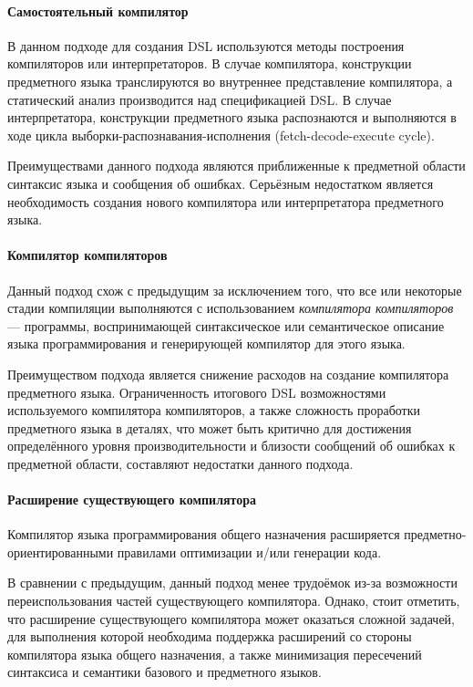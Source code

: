 \paragraph{Самостоятельный компилятор}
В данном подходе для создания DSL используются методы построения
компиляторов или интерпретаторов. В случае компилятора, конструкции
предметного языка транслируются во внутреннее представление компилятора, а
статический анализ производится над спецификацией DSL. В случае
интерпретатора, конструкции предметного языка распознаются и выполняются
в ходе цикла выборки-распознавания-исполнения (fetch-decode-execute cycle).

Преимуществами данного подхода являются приближенные к предметной
области синтаксис языка и сообщения об ошибках. Серьёзным недостатком
является необходимость создания нового компилятора или интерпретатора
предметного языка.

\paragraph{Компилятор компиляторов}
Данный подход схож с предыдущим за исключением того, что все или некоторые
стадии компиляции выполняются с использованием \textit{компилятора компиляторов} --- программы, воспринимающей синтаксическое или семантическое
описание языка программирования и генерирующей компилятор для этого языка.

Преимуществом подхода является снижение расходов на создание компилятора
предметного языка. Ограниченность итогового DSL возможностями используемого
компилятора компиляторов, а также сложность проработки предметного языка в
деталях, что может быть критично для достижения определённого уровня
производительности и близости сообщений об ошибках к предметной области,
составляют недостатки данного подхода.

\paragraph{Расширение существующего компилятора}
Компилятор языка программирования общего назначения расширяется
предметно-ориенти\-рованными правилами оптимизации и/или генерации кода.

В сравнении с предыдущим, данный подход менее трудоёмок из-за возможности
переиспользования частей существующего компилятора. Однако, стоит отметить,
что расширение существующего компилятора может оказаться сложной задачей,
для выполнения которой необходима поддержка расширений со стороны
компилятора языка общего назначения, а также минимизация пересечений
синтаксиса и семантики базового и предметного языков.

